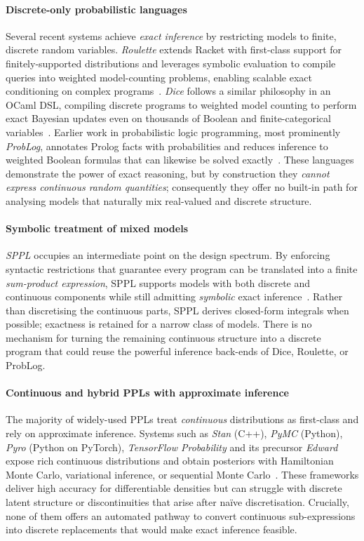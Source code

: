 \documentclass[nonacm,anonymous]{acmart}
\begin{document}
\paragraph{Discrete-only probabilistic languages}  
Several recent systems achieve \emph{exact inference} by restricting models to finite, discrete random variables. \emph{Roulette} extends Racket with first-class support for finitely-supported distributions and leverages symbolic evaluation to compile queries into weighted model-counting problems, enabling scalable exact conditioning on complex programs~\cite{Moy2025Roulette}. \emph{Dice} follows a similar philosophy in an OCaml DSL, compiling discrete programs to weighted model counting to perform exact Bayesian updates even on thousands of Boolean and finite-categorical variables~\cite{Holtzen2020Dice}. Earlier work in probabilistic logic programming, most prominently \emph{ProbLog}, annotates Prolog facts with probabilities and reduces inference to weighted Boolean formulas that can likewise be solved exactly~\cite{DeRaedt2007ProbLog}. These languages demonstrate the power of exact reasoning, but by construction they \emph{cannot express continuous random quantities}; consequently they offer no built-in path for analysing models that naturally mix real-valued and discrete structure.  

\paragraph{Symbolic treatment of mixed models}  
\emph{SPPL} occupies an intermediate point on the design spectrum. By enforcing syntactic restrictions that guarantee every program can be translated into a finite \emph{sum-product expression}, SPPL supports models with both discrete and continuous components while still admitting \emph{symbolic} exact inference~\cite{Saad2021SPPL}. Rather than discretising the continuous parts, SPPL derives closed-form integrals when possible; exactness is retained for a narrow class of models. There is no mechanism for turning the remaining continuous structure into a discrete program that could reuse the powerful inference back-ends of Dice, Roulette, or ProbLog.

\paragraph{Continuous and hybrid PPLs with approximate inference}  
The majority of widely-used PPLs treat \emph{continuous} distributions as first-class and rely on approximate inference. Systems such as \emph{Stan} (C++), \emph{PyMC} (Python), \emph{Pyro} (Python on PyTorch), \emph{TensorFlow Probability} and its precursor \emph{Edward} expose rich continuous distributions and obtain posteriors with Hamiltonian Monte Carlo, variational inference, or sequential Monte Carlo~\cite{Carpenter2017Stan,Salvatier2016PyMC3,Bingham2019Pyro,Dillon2017TFP,Tran2016Edward}. These frameworks deliver high accuracy for differentiable densities but can struggle with discrete latent structure or discontinuities that arise after naïve discretisation. Crucially, none of them offers an automated pathway to convert continuous sub-expressions into discrete replacements that would make exact inference feasible.
\end{document}
